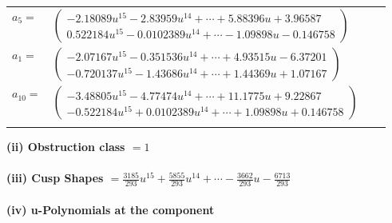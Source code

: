 \documentclass[1p]{elsarticle_modified}
\theoremstyle{definition}
\begin{document}
\begin{tabular}{m{7pt} m{180pt} m{7pt} m{180pt} }
\flushright $a_{5}=$&$\begin{pmatrix}-2.18089 u^{15}-2.83959 u^{14}+\cdots+5.88396 u+3.96587\\0.522184 u^{15}-0.0102389 u^{14}+\cdots-1.09898 u-0.146758\end{pmatrix}$ \\
\flushright $a_{1}=$&$\begin{pmatrix}-2.07167 u^{15}-0.351536 u^{14}+\cdots+4.93515 u-6.37201\\-0.720137 u^{15}-1.43686 u^{14}+\cdots+1.44369 u+1.07167\end{pmatrix}$ \\
\flushright $a_{10}=$&$\begin{pmatrix}-3.48805 u^{15}-4.77474 u^{14}+\cdots+11.1775 u+9.22867\\-0.522184 u^{15}+0.0102389 u^{14}+\cdots+1.09898 u+0.146758\end{pmatrix}$\\&\end{tabular}
\flushleft \textbf{(ii) Obstruction class $= 1$}\\~\\
\flushleft \textbf{(iii) Cusp Shapes $= \frac{3185}{293} u^{15}+\frac{5855}{293} u^{14}+\cdots-\frac{3662}{293} u-\frac{6713}{293}$}\\~\\
\newpage\renewcommand{\arraystretch}{1}
\flushleft \textbf{(iv) u-Polynomials at the component}\newline \\
\end{document}

